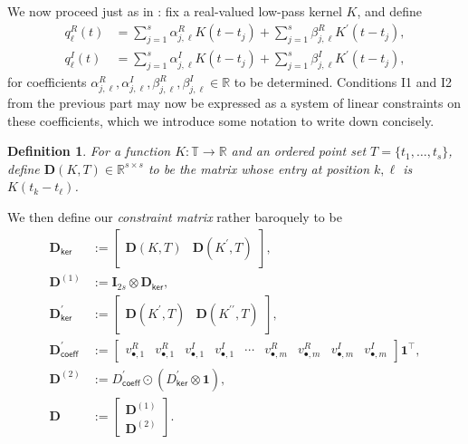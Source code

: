 \documentclass[11pt]{article}
\newcommand{\RR}{\mathbb{R}}
\newcommand{\TT}{\mathbb{T}}
\newcommand{\one}{\bm{1}}
\newcommand{\bD}{\bm D}
\newtheorem{definition}{Definition}
\begin{document}
We now proceed just as in \cite{fernandez2016super}: fix a real-valued low-pass kernel $K$, and define
\begin{align}
  q_\ell^R(t) &= \sum_{j = 1}^s \alpha_{j, \ell}^R K(t - t_j) + \sum_{j = 1}^s \beta_{j, \ell}^R K^\prime(t - t_j), \\
  q_\ell^I(t) &= \sum_{j = 1}^s \alpha_{j, \ell}^I K(t - t_j) + \sum_{j = 1}^s \beta_{j, \ell}^I K^\prime(t - t_j),
\end{align}
for coefficients $\alpha_{j, \ell}^R, \alpha_{j, \ell}^I, \beta_{j, \ell}^R, \beta_{j, \ell}^I \in \RR$ to be determined.
Conditions I1 and I2 from the previous part may now be expressed as a system of linear constraints on these coefficients, which we introduce some notation to write down concisely.
\begin{definition}
    For a function $K: \TT \to \RR$ and an ordered point set $T = \{t_1, \dots, t_s\}$, define $\bD(K, T) \in \RR^{s \times s}$ to be the matrix whose entry at position $k, \ell$ is $K(t_k - t_\ell)$.
\end{definition}
We then define our \emph{constraint matrix} rather baroquely to be
\begin{align}
  \bD_{\textsf{ker}}
  &:= \left[
        \begin{array}{cc}
          \bD(K, T) & \bD(K^\prime, T)
        \end{array}\right], \\
  \bD^{(1)} &:= \bm I_{2s} \otimes \bD_{\textsf{ker}}, \\
  \bD_{\textsf{ker}}^\prime
  &:= \left[
        \begin{array}{cc}
          \bD(K^\prime, T) & \bD(K^{\prime\prime}, T)
        \end{array}\right], \\
  \bD^{\prime}_{\textsf{coeff}} &:= \left[
              \begin{array}{ccccccccc}
                v_{\bullet, 1}^R & v_{\bullet, 1}^R & v_{\bullet, 1}^I & v_{\bullet, 1}^I & \cdots & v_{\bullet, m}^R & v_{\bullet, m}^R & v_{\bullet, m}^I & v_{\bullet, m}^I
              \end{array} \right] \one^\top , \\
  \bD^{(2)} &:= D^\prime_{\textsf{coeff}} \odot (D^\prime_{\textsf{ker}} \otimes \one), \\
  \bD &:= \left[\begin{array}{c} \bD^{(1)} \\ \bD^{(2)} \end{array}\right].
\end{align}
\end{document}
